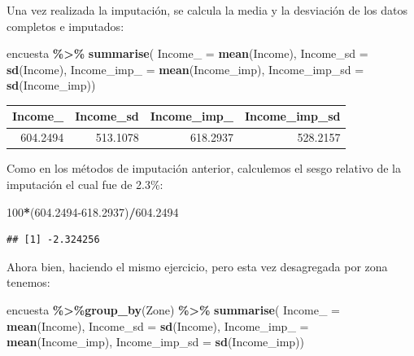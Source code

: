 \documentclass[
  12pt,
]{book}
\newenvironment{Shaded}{\begin{snugshade}}{\end{snugshade}}
\newcommand{\AttributeTok}[1]{\textcolor[rgb]{0.13,0.29,0.53}{#1}}
\newcommand{\DecValTok}[1]{\textcolor[rgb]{0.00,0.00,0.81}{#1}}
\newcommand{\FloatTok}[1]{\textcolor[rgb]{0.00,0.00,0.81}{#1}}
\newcommand{\FunctionTok}[1]{\textcolor[rgb]{0.13,0.29,0.53}{\textbf{#1}}}
\newcommand{\NormalTok}[1]{#1}
\newcommand{\SpecialCharTok}[1]{\textcolor[rgb]{0.81,0.36,0.00}{\textbf{#1}}}
\begin{document}
Una vez realizada la imputación, se calcula la media y la desviación de los datos completos e imputados:

\begin{Shaded}
\begin{Highlighting}[]
\NormalTok{encuesta }\SpecialCharTok{\%\textgreater{}\%} \FunctionTok{summarise}\NormalTok{(}
  \AttributeTok{Income\_ =} \FunctionTok{mean}\NormalTok{(Income),}
  \AttributeTok{Income\_sd =} \FunctionTok{sd}\NormalTok{(Income),}
  \AttributeTok{Income\_imp\_ =} \FunctionTok{mean}\NormalTok{(Income\_imp),}
  \AttributeTok{Income\_imp\_sd =} \FunctionTok{sd}\NormalTok{(Income\_imp))}
\end{Highlighting}
\end{Shaded}

\begin{tabular}{r|r|r|r}
\hline
Income\_ & Income\_sd & Income\_imp\_ & Income\_imp\_sd\\
\hline
604.2494 & 513.1078 & 618.2937 & 528.2157\\
\hline
\end{tabular}

Como en los métodos de imputación anterior, calculemos el sesgo relativo de la imputación el cual fue de 2.3\%:

\begin{Shaded}
\begin{Highlighting}[]
\DecValTok{100}\SpecialCharTok{*}\NormalTok{(}\FloatTok{604.2494{-}618.2937}\NormalTok{)}\SpecialCharTok{/}\FloatTok{604.2494}
\end{Highlighting}
\end{Shaded}

\begin{verbatim}
## [1] -2.324256
\end{verbatim}

Ahora bien, haciendo el mismo ejercicio, pero esta vez desagregada por zona tenemos:

\begin{Shaded}
\begin{Highlighting}[]
\NormalTok{encuesta }\SpecialCharTok{\%\textgreater{}\%}\FunctionTok{group\_by}\NormalTok{(Zone) }\SpecialCharTok{\%\textgreater{}\%}  \FunctionTok{summarise}\NormalTok{(}
  \AttributeTok{Income\_ =} \FunctionTok{mean}\NormalTok{(Income),}
  \AttributeTok{Income\_sd =} \FunctionTok{sd}\NormalTok{(Income),}
  \AttributeTok{Income\_imp\_ =} \FunctionTok{mean}\NormalTok{(Income\_imp),}
  \AttributeTok{Income\_imp\_sd =} \FunctionTok{sd}\NormalTok{(Income\_imp))}
\end{Highlighting}
\end{Shaded}
\end{document}
